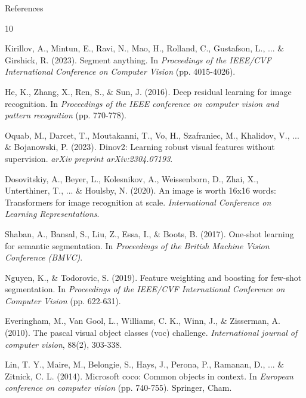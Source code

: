 \documentclass[aspectratio=169, 10pt]{beamer}
\begin{document}
\begin{frame}[allowframebreaks]{References}
    
    \begin{thebibliography}{10}

    Kirillov, A., Mintun, E., Ravi, N., Mao, H., Rolland, C., Gustafson, L., ... \& Girshick, R. (2023). Segment anything. In \textit{Proceedings of the IEEE/CVF International Conference on Computer Vision} (pp. 4015-4026).

    He, K., Zhang, X., Ren, S., \& Sun, J. (2016). Deep residual learning for image recognition. In \textit{Proceedings of the IEEE conference on computer vision and pattern recognition} (pp. 770-778).

    Oquab, M., Darcet, T., Moutakanni, T., Vo, H., Szafraniec, M., Khalidov, V., ... \& Bojanowski, P. (2023). Dinov2: Learning robust visual features without supervision. \textit{arXiv preprint arXiv:2304.07193}.

    Dosovitskiy, A., Beyer, L., Kolesnikov, A., Weissenborn, D., Zhai, X., Unterthiner, T., ... \& Houlsby, N. (2020). An image is worth 16x16 words: Transformers for image recognition at scale. \textit{International Conference on Learning Representations}.

    Shaban, A., Bansal, S., Liu, Z., Essa, I., \& Boots, B. (2017). One-shot learning for semantic segmentation. In \textit{Proceedings of the British Machine Vision Conference (BMVC)}.

    Nguyen, K., \& Todorovic, S. (2019). Feature weighting and boosting for few-shot segmentation. In \textit{Proceedings of the IEEE/CVF International Conference on Computer Vision} (pp. 622-631).

    Everingham, M., Van Gool, L., Williams, C. K., Winn, J., \& Zisserman, A. (2010). The pascal visual object classes (voc) challenge. \textit{International journal of computer vision}, 88(2), 303-338.

    Lin, T. Y., Maire, M., Belongie, S., Hays, J., Perona, P., Ramanan, D., ... \& Zitnick, C. L. (2014). Microsoft coco: Common objects in context. In \textit{European conference on computer vision} (pp. 740-755). Springer, Cham.


\end{thebibliography}
\end{frame}
\end{document}
